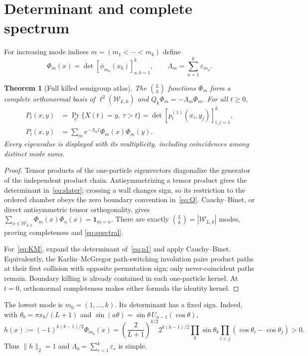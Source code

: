 \documentclass[10pt]{article}
\newtheorem{theorem}{Theorem}
\newcommand{\W}{\mathcal W}
\newcommand{\1}{\mathbf 1}
\newcommand{\e}{\varepsilon}
\begin{document}
\section{Determinant and complete spectrum}
For increasing mode indices $m=(m_1<\cdots<m_k)$ define
\begin{equation}\label{eq:slater}
 \Phi_m(x)=\det[\phi_{m_a}(x_b)]_{a,b=1}^k,\qquad
 \Lambda_m=\sum_{a=1}^k\e_{m_a}.
\end{equation}

\begin{theorem}[Full killed semigroup atlas]\label{thm:spectrum}
The $\binom Lk$ functions $\Phi_m$ form a complete orthonormal basis of
$\ell^2(\W_{L,k})$ and $Q_k\Phi_m=-\Lambda_m\Phi_m$.  For all $t\geq0$,
\begin{align}
 P_t(x,y)&=\Pr_x\{X(t)=y,\ \tau>t\}
     =\det[p_t^{(1)}(x_i,y_j)]_{i,j=1}^k,\label{eq:KM}\\
 P_t(x,y)&=\sum_m e^{-\Lambda_mt}\Phi_m(x)\Phi_m(y).\label{eq:spectral}
\end{align}
Every eigenvalue is displayed with its multiplicity, including coincidences
among distinct mode sums.
\end{theorem}

\begin{proof}
Tensor products of the one-particle eigenvectors diagonalize the generator of
the independent product chain.  Antisymmetrizing a tensor product gives the
determinant in~\eqref{eq:slater}; crossing a wall changes sign, so its
restriction to the ordered chamber obeys the zero boundary convention
in~\eqref{eq:Q}.  Cauchy--Binet, or direct antisymmetric tensor
orthogonality, gives
$\sum_{x\in\W_{L,k}}\Phi_m(x)\Phi_n(x)=\1_{m=n}$.
There are exactly $\binom Lk=|\W_{L,k}|$ modes, proving completeness and
\eqref{eq:spectral}.

For~\eqref{eq:KM}, expand the determinant of~\eqref{eq:p1} and apply
Cauchy--Binet.  Equivalently, the Karlin--McGregor path-switching involution
pairs product paths at their first collision with opposite permutation sign;
only never-coincident paths remain.  Boundary killing is already contained
in each one-particle kernel.  At $t=0$, orthonormal completeness makes either
formula the identity kernel.
\end{proof}

The lowest mode is $m_0=(1,\ldots,k)$.  Its determinant has a fixed sign.
Indeed, with $\theta_b=\pi x_b/(L+1)$ and
$\sin(a\theta)=\sin\theta\,U_{a-1}(\cos\theta)$,
\begin{equation}\label{eq:positive}
 h(x):=(-1)^{k(k-1)/2}\Phi_{m_0}(x)
 =\left(\frac2{L+1}\right)^{k/2}2^{k(k-1)/2}
 \prod_b\sin\theta_b\prod_{i<j}(\cos\theta_i-\cos\theta_j)>0.
\end{equation}
Thus $\|h\|_2=1$ and
$\Lambda_0=\sum_{r=1}^k\e_r$ is simple.
\end{document}
